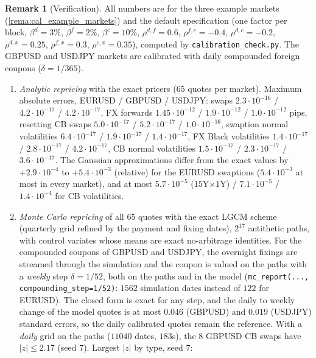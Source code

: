 \documentclass[11pt,english]{amsart}
\theoremstyle{definition}
\newtheorem{rema}{Remark}
\begin{document}
\begin{rema}[Verification]\label{rema:cal_verification}
All numbers are for the three example markets (\autoref{rema:cal_example_markets}) and the default specification (one factor per block, $\beta^d = 3\%$, $\beta^f = 2\%$, $\beta^c = 10\%$, $\rho^{d,f} = 0.6$, $\rho^{f,c} = -0.4$, $\rho^{d,c} = -0.2$, $\rho^{d,x} = 0.25$, $\rho^{f,x} = 0.3$, $\rho^{c,x} = 0.35$), computed by \texttt{calibration\_check.py}. The GBPUSD and USDJPY markets are calibrated with daily compounded foreign coupons ($\delta = 1/365$).
\begin{enumerate}
\item \emph{Analytic repricing} with the exact pricers (65 quotes per market). Maximum absolute errors, EURUSD / GBPUSD / USDJPY: swaps $2.3\cdot10^{-16}$ / $4.2\cdot10^{-17}$ / $4.2\cdot10^{-17}$, FX forwards $1.45\cdot10^{-12}$ / $1.9\cdot10^{-12}$ / $1.0\cdot10^{-12}$ pips, resetting CB swaps $5.0\cdot10^{-17}$ / $5.2\cdot10^{-17}$ / $1.0\cdot10^{-16}$, swaption normal volatilities $6.4\cdot10^{-17}$ / $1.9\cdot10^{-17}$ / $1.4\cdot10^{-17}$, FX Black volatilities $1.4\cdot10^{-17}$ / $2.8\cdot10^{-17}$ / $4.2\cdot10^{-17}$, CB normal volatilities $1.5\cdot10^{-17}$ / $2.3\cdot10^{-17}$ / $3.6\cdot10^{-17}$. The Gaussian approximations differ from the exact values by $+2.9\cdot10^{-4}$ to $+5.4\cdot10^{-3}$ (relative) for the EURUSD swaptions ($5.4\cdot10^{-3}$ at most in every market), and at most $5.7\cdot10^{-5}$ ($15$Y$\times1$Y) / $7.1\cdot10^{-5}$ / $1.4\cdot10^{-4}$ for CB volatilities.
\item \emph{Monte Carlo repricing} of all 65 quotes with the exact LGCM scheme (quarterly grid refined by the payment and fixing dates), $2^{17}$ antithetic paths, with control variates whose means are exact no-arbitrage identities. For the compounded coupons of GBPUSD and USDJPY, the overnight fixings are streamed through the simulation and the coupon is valued on the paths with a \emph{weekly} step $\delta = 1/52$, both on the paths and in the model (\texttt{mc\_report(..., compounding\_step=1/52)}: $1562$ simulation dates instead of $122$ for EURUSD). The closed form is exact for any step, and the daily to weekly change of the model quotes is at most $0.046$ (GBPUSD) and $0.019$ (USDJPY) standard errors, so the daily calibrated quotes remain the reference. With a \emph{daily} grid on the paths ($11040$ dates, $183$s), the $8$ GBPUSD CB swaps have $|z|\le2.17$ (seed $7$). Largest $|z|$ by type, seed $7$:
\begin{center}
\begin{tabular}{|l|c|c|c|}

\end{tabular}
\end{center}
\end{enumerate}
\end{rema}
\end{document}
